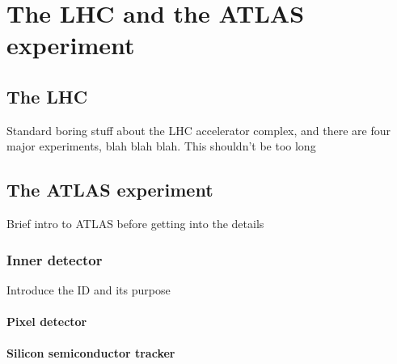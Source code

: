 \chapter[The LHC and the ATLAS experiment][The LHC and ATLAS]
        {The LHC and the ATLAS experiment}

\section{The LHC}

{\color{red}Standard boring stuff about the LHC accelerator complex, and there
  are four major experiments, blah blah blah. This shouldn't be too long}

\section{The ATLAS experiment}

{\color{red} Brief intro to ATLAS before getting into the details}

\subsection{Inner detector} 

{\color{red} Introduce the ID and its purpose}

\subsubsection{Pixel detector} 

\subsubsection{Silicon semiconductor tracker} 

